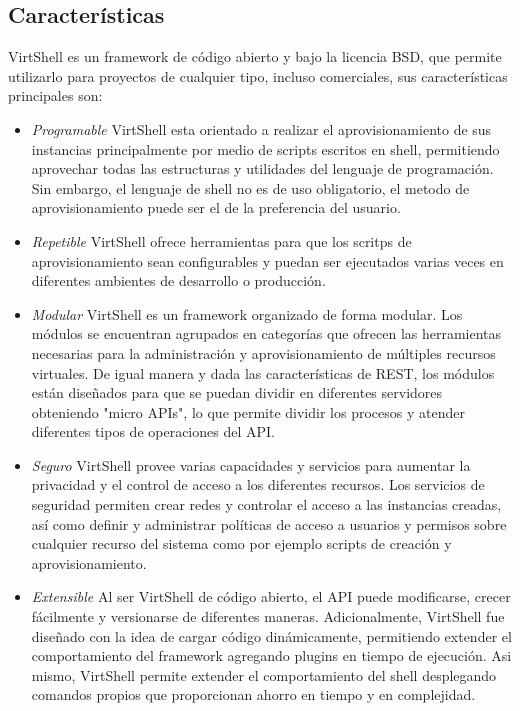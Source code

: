\documentclass[conference, spanish]{IEEEtran}
\begin{document}
\subsection{Características}
VirtShell es un framework de código abierto y bajo la licencia BSD, que permite utilizarlo para proyectos de cualquier tipo, incluso comerciales, sus características principales son: 

\begin{itemize}
\item \emph{Programable} VirtShell esta orientado a realizar el aprovisionamiento de sus instancias principalmente por medio de scripts escritos en shell, permitiendo aprovechar todas las estructuras y utilidades del lenguaje de programación. Sin embargo, el lenguaje de shell no es de uso obligatorio, el  metodo de aprovisionamiento puede ser el de la preferencia del usuario. 
\item \emph{Repetible} VirtShell ofrece herramientas para que los scritps de aprovisionamiento sean configurables y  puedan ser ejecutados varias veces en diferentes ambientes de desarrollo o producción.
\item \emph{Modular} VirtShell es un framework organizado de forma modular. Los módulos se encuentran agrupados en categorías que ofrecen las herramientas necesarias para la administración y aprovisionamiento de múltiples recursos virtuales. De igual manera y dada las características de REST, los módulos están diseñados para que se puedan dividir en diferentes servidores obteniendo "micro APIs", lo que permite dividir los procesos y atender diferentes tipos de operaciones del API. 
\item \emph{Seguro} VirtShell provee varias capacidades y servicios para aumentar la privacidad y el control de acceso a los diferentes recursos. Los servicios de seguridad permiten crear redes y controlar el acceso a las instancias creadas, así como definir y administrar políticas de acceso a usuarios y permisos sobre cualquier recurso del sistema como por ejemplo scripts de creación y aprovisionamiento.
\item \emph{Extensible} Al ser VirtShell de código abierto, el API puede modificarse, crecer fácilmente y versionarse de diferentes maneras. Adicionalmente, VirtShell fue diseñado con la idea de cargar código dinámicamente, permitiendo extender el comportamiento del framework agregando plugins en tiempo de ejecución.  Asi mismo, VirtShell permite extender el comportamiento del shell desplegando comandos propios que proporcionan ahorro en tiempo y en complejidad.

\end{itemize}
\end{document}
